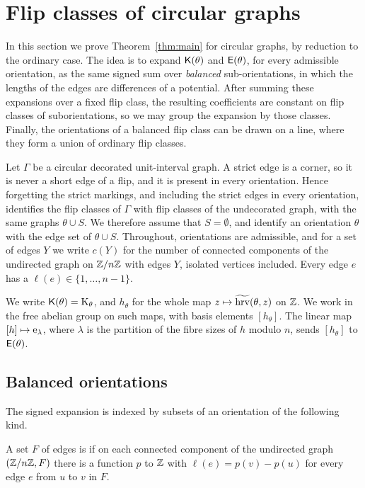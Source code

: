 \section{Flip classes of circular graphs}\label{sec:circular}

In this section we prove Theorem~\ref{thm:main} for circular graphs, by
reduction to the ordinary case.
The idea is to expand $\mathsf{K}(\theta)$ and $\mathsf{E}(\theta)$, for every admissible
orientation, as the same signed sum over \emph{balanced} sub-orientations, in
which the lengths of the edges are differences of a potential.
After summing these expansions over a fixed flip class, the resulting
coefficients are constant on flip classes of suborientations, so we may group
the expansion by those classes.
Finally, the orientations of a balanced flip class can be drawn on a line, where
they form a union of ordinary flip classes.

Let $\Gamma$ be a circular decorated unit-interval graph.
A strict edge is a corner, so it is never a short edge of a flip, and it is
present in every orientation.
Hence forgetting the strict markings, and including the strict edges in every
orientation, identifies the flip classes of $\Gamma$ with flip classes of the
undecorated graph, with the same graphs $\theta\cup S$.
We therefore assume that $S=\emptyset$, and identify an orientation $\theta$ with
the edge set of $\theta\cup S$.
Throughout, orientations are admissible, and for a set of edges $Y$ we write
$c(Y)$ for the number of connected components of the undirected graph on
$\mathbb{Z}/n\mathbb{Z}$ with edges $Y$, isolated vertices included.
Every edge $e$ has a  $\ell(e)\in\{1,\dotsc,n-1\}$.

We write $\mathsf{K}(\theta)=\mathrm{K}_{\theta}$, and $h_\theta$ for the whole map
$z\mapsto\widetilde{\operatorname{hrv}}(\theta,z)$ on $\mathbb{Z}$.
We work in the free abelian group on such maps, with basis elements $[h_\theta]$.
The linear map $[h]\mapsto\mathrm{e}_\lambda$, where $\lambda$ is the partition
of the fibre sizes of $h$ modulo $n$, sends $[h_\theta]$ to $\mathsf{E}(\theta)$.

\subsection{Balanced orientations}
The signed expansion is indexed by subsets of an orientation of the following
kind.

\begin{definition}
A set $F$ of edges is  if on each connected component of the
undirected graph $(\mathbb{Z}/n\mathbb{Z},F)$ there is a function $p$ to $\mathbb{Z}$ with
$\ell(e)=p(v)-p(u)$ for every edge $e$ from $u$ to $v$ in $F$.
\end{definition}

